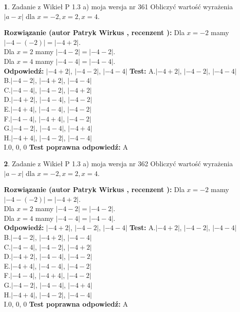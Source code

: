 \documentclass[12pt, a4paper]{article}
\theoremstyle{definition} %
\newtheorem{zad}{}
\newcommand{\zadStart}[1]{\begin{zad}#1\newline}
\newcommand{\zadStop}{\end{zad}}
\newcommand{\rozwStart}[2]{\noindent \textbf{Rozwiązanie (autor #1 , recenzent #2): }\newline}
\newcommand{\rozwStop}{\newline}
\newcommand{\odpStart}{\noindent \textbf{Odpowiedź:}\newline}
\newcommand{\odpStop}{\newline}
\newcommand{\testStart}{\noindent \textbf{Test:}\newline}
\newcommand{\testStop}{\newline}
\newcommand{\kluczStart}{\noindent \textbf{Test poprawna odpowiedź:}\newline}
\newcommand{\kluczStop}{\newline}
\begin{document}
\zadStart{Zadanie z Wikieł P 1.3 a) moja wersja nr 361}
Obliczyć wartość wyrażenia $|a - x|$ dla $x=-2,x=2,x=4$.
\zadStop
\rozwStart{Patryk Wirkus}{}
Dla $x = -2$ mamy $|-4 - (-2)| = |-4 + 2|$.\\
Dla $x = 2$ mamy $|-4 - 2| = |-4 - 2|$.\\
Dla $x = 4$ mamy $|-4 - 4| = |-4 - 4|$.\\
\rozwStop
\odpStart
$|-4 + 2|$, $|-4 - 2|$, $|-4 - 4|$
\odpStop
\testStart
A.$|-4 + 2|$, $|-4 - 2|$, $|-4 - 4|$\\
B.$|-4 - 2|$, $|-4 + 2|$, $|-4 - 4|$\\
C.$|-4 - 4|$, $|-4 - 2|$, $|-4 + 2|$\\
D.$|-4 + 2|$, $|-4 - 4|$, $|-4 - 2|$\\
E.$|-4 + 4|$, $|-4 - 4|$, $|-4 - 2|$\\
F.$|-4 - 4|$, $|-4 + 4|$, $|-4 - 2|$\\
G.$|-4 - 2|$, $|-4 - 4|$, $|-4 + 4|$\\
H.$|-4 + 4|$, $|-4 - 2|$, $|-4 - 4|$\\
I.$0$, $0$, $0$
\testStop
\kluczStart
A
\kluczStop



\zadStart{Zadanie z Wikieł P 1.3 a) moja wersja nr 362}
Obliczyć wartość wyrażenia $|a - x|$ dla $x=-2,x=2,x=4$.
\zadStop
\rozwStart{Patryk Wirkus}{}
Dla $x = -2$ mamy $|-4 - (-2)| = |-4 + 2|$.\\
Dla $x = 2$ mamy $|-4 - 2| = |-4 - 2|$.\\
Dla $x = 4$ mamy $|-4 - 4| = |-4 - 4|$.\\
\rozwStop
\odpStart
$|-4 + 2|$, $|-4 - 2|$, $|-4 - 4|$
\odpStop
\testStart
A.$|-4 + 2|$, $|-4 - 2|$, $|-4 - 4|$\\
B.$|-4 - 2|$, $|-4 + 2|$, $|-4 - 4|$\\
C.$|-4 - 4|$, $|-4 - 2|$, $|-4 + 2|$\\
D.$|-4 + 2|$, $|-4 - 4|$, $|-4 - 2|$\\
E.$|-4 + 4|$, $|-4 - 4|$, $|-4 - 2|$\\
F.$|-4 - 4|$, $|-4 + 4|$, $|-4 - 2|$\\
G.$|-4 - 2|$, $|-4 - 4|$, $|-4 + 4|$\\
H.$|-4 + 4|$, $|-4 - 2|$, $|-4 - 4|$\\
I.$0$, $0$, $0$
\testStop
\kluczStart
A
\kluczStop
\end{document}
